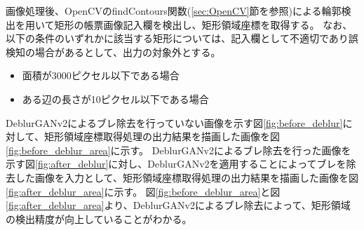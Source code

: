 画像処理後、OpenCVのfindContours関数(\ref{sec:OpenCV}節を参照)による輪郭検出を用いて矩形の帳票画像記入欄を検出し、矩形領域座標を取得する。
なお、以下の条件のいずれかに該当する矩形については、記入欄として不適切であり誤検知の場合があるとして、出力の対象外とする。

\begin{itemize}
    \item 面積が3000ピクセル以下である場合
    \item ある辺の長さが10ピクセル以下である場合
\end{itemize}

DeblurGANv2によるブレ除去を行っていない画像を示す図\ref{fig:before_deblur}に対して、矩形領域座標取得処理の出力結果を描画した画像を図\ref{fig:before_deblur_area}に示す。
DeblurGANv2によるブレ除去を行った画像を示す図\ref{fig:after_deblur}に対し、DeblurGANv2を適用することによってブレを除去した画像を入力として、矩形領域座標取得処理の出力結果を描画した画像を図\ref{fig:after_deblur_area}に示す。
図\ref{fig:before_deblur_area}と図\ref{fig:after_deblur_area}より、DeblurGANv2によるブレ除去によって、矩形領域の検出精度が向上していることがわかる。

